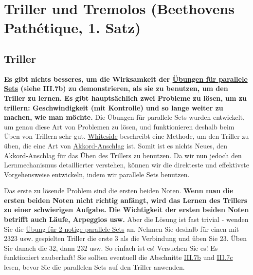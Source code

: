 
\section{Triller und Tremolos (Beethovens Pathétique, 1. Satz)}\hypertarget{c1iii3}{}

\subsection{Triller}

\textbf{Es gibt nichts besseres, um die Wirksamkeit der \hyperlink{c1iii7b}{Übungen für parallele Sets} (siehe III.7b) zu demonstrieren, als sie zu benutzen, um den Triller zu lernen.
Es gibt hauptsächlich zwei Probleme zu lösen, um zu trillern: Geschwindigkeit (mit Kontrolle) und so lange weiter zu machen, wie man möchte.}
Die Übungen für parallele Sets wurden entwickelt, um genau diese Art von Problemen zu lösen, und funktionieren deshalb beim Üben von Trillern sehr gut.
\hyperlink{Whiteside}{Whiteside} beschreibt eine Methode, um den Triller zu üben, die eine Art von \hyperlink{c1ii9}{Akkord-Anschlag} ist.
Somit ist es nichts Neues, den Akkord-Anschlag für das Üben des Trillers zu benutzen.
Da wir nun jedoch den Lernmechanismus detaillierter verstehen, können wir die direkteste und effektivste Vorgehensweise entwickeln, indem wir parallele Sets benutzen.

Das erste zu lösende Problem sind die ersten beiden Noten.
\textbf{Wenn man die ersten beiden Noten nicht richtig anfängt, wird das Lernen des Trillers zu einer schwierigen Aufgabe.
Die Wichtigkeit der ersten beiden Noten betrifft auch Läufe, Arpeggios usw.}
Aber die Lösung ist fast trivial - wenden Sie die \hyperlink{c1iii7b2}{Übung für 2-notige parallele Sets} an.
Nehmen Sie deshalb für einen mit 2323 usw. gespielten Triller die erste 3 als die Verbindung und üben Sie 23.
Üben Sie danach die 32, dann 232 usw.
So einfach ist es! Versuchen Sie es! Es funktioniert zauberhaft!
Sie sollten eventuell die Abschnitte \hyperlink{c1iii7b}{III.7b} und \hyperlink{c1iii7c}{III.7c} lesen, bevor Sie die parallelen Sets auf den Triller anwenden.

